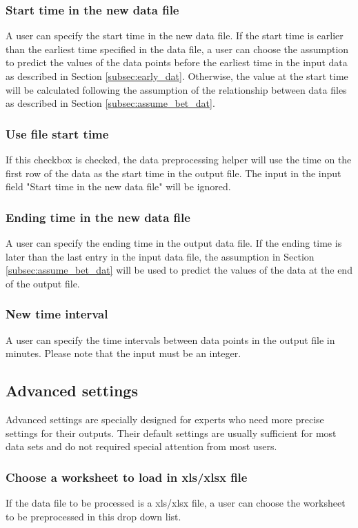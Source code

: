 \documentclass[12pt,a4paper]{article}
\begin{document}
\subsubsection{Start time in the new data file}
A user can specify the start time in the new data file.
If the start time is earlier than the earliest time specified in the data file, a user can choose the assumption to predict the values of the data points before the earliest time in the input data as described in Section \ref{subsec:early_dat}.
Otherwise, the value at the start time will be calculated following the assumption of the relationship between data files as described in Section \ref{subsec:assume_bet_dat}.

\subsubsection{Use file start time}
If this checkbox is checked, the data preprocessing helper will use the time on the first row of the data as the start time in the output file.
The input in the input field "Start time in the new data file" will be ignored.

\subsubsection{Ending time in the new data file}
A user can specify the ending time in the output data file.
If the ending time is later than the last entry in the input data file, the assumption in Section \ref{subsec:assume_bet_dat} will be used to predict the values of the data at the end of the output file.

\subsubsection{New time interval}
A user can specify the time intervals between data points in the output file in minutes.
Please note that the input must be an integer.

\subsection{Advanced settings}
Advanced settings are specially designed for experts who need more precise settings for their outputs.
 Their default settings are usually sufficient for most data sets and do not required special attention from most users.

\subsubsection{Choose a worksheet to load in xls/xlsx file}
If the data file to be processed is a xls/xlsx file, a user can choose the worksheet to be preprocessed in this drop down list.
\end{document}
